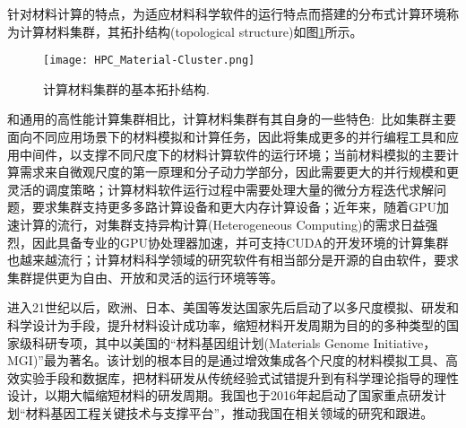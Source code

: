 针对材料计算的特点，为适应材料科学软件的运行特点而搭建的分布式计算环境称为计算材料集群，其拓扑结构(\textrm{topological structure})如图\ref{Fig:HPC_Cluster}所示。
\begin{figure}[h!]
\centering
\texttt{[image: HPC\_Material-Cluster.png]}%
\caption{计算材料集群的基本拓扑结构.}%
\label{Fig:HPC_Cluster}
\end{figure}
和通用的高性能计算集群相比，计算材料集群有其自身的一些特色:~比如集群主要面向不同应用场景下的材料模拟和计算任务，因此将集成更多的并行编程工具和应用中间件，以支撑不同尺度下的材料计算软件的运行环境；当前材料模拟的主要计算需求来自微观尺度的第一原理和分子动力学部分，因此需要更大的并行规模和更灵活的调度策略；计算材料软件运行过程中需要处理大量的微分方程迭代求解问题，要求集群支持更多多路计算设备和更大内存计算设备；近年来，随着\textrm{GPU}加速计算的流行，对集群支持异构计算\textrm{(Heterogeneous Computing)}的需求日益强烈，因此具备专业的\textrm{GPU}协处理器加速，并可支持\textrm{CUDA}的开发环境的计算集群也越来越流行；计算材料科学领域的研究软件有相当部分是开源的自由软件，要求集群提供更为自由、开放和灵活的运行环境等等。


进入21世纪以后，欧洲、日本、美国等发达国家先后启动了以多尺度模拟、研发和科学设计为手段，提升材料设计成功率，缩短材料开发周期为目的的多种类型的国家级科研专项，其中以美国的“材料基因组计划\textrm{(Materials Genome Initiative， MGI)}”最为著名。该计划的根本目的是通过增效集成各个尺度的材料模拟工具、高效实验手段和数据库，把材料研发从传统经验式试错提升到有科学理论指导的理性设计，以期大幅缩短材料的研发周期。我国也于2016年起启动了国家重点研发计划“材料基因工程关键技术与支撑平台”，推动我国在相关领域的研究和跟进。

